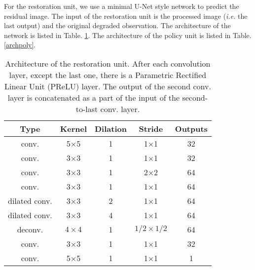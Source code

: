 \documentclass{article} %
\begin{document}
For the restoration unit, we use a minimal
U-Net \citep{ronneberger2015u} style network to predict the residual image.
The input of the restoration unit is the processed image (\textit{i.e.} the
last output) and the original degraded observation. The architecture of
the network is listed in Table. \ref{arch}.
The architecture of the policy unit is listed in Table. \ref{archpoly}.

\begin{table}[htp!]
	\caption{Architecture of the restoration unit. After each convolution layer,
		except the last one, there is a Parametric Rectified Linear Unit (PReLU) layer.
		The output of the second conv. layer is concatenated as a part of the input of
		the second-to-last conv. layer.}
	\label{arch}
	\centering
	\begin{tabular}{ccccc}
		\toprule
		Type & Kernel & Dilation & Stride & Outputs\\
		\hline\hline
		conv.& 5$\times$5& 1 & 1$\times$1 &32\\
		conv.& 3$\times$3& 1 & 1$\times$1 &32\\
		\hline
		conv.& 3$\times$3& 1 & 2$\times$2 &64\\
		
		conv.& 3$\times$3&1&1$\times$1&64\\
		dilated conv.&3$\times$3&2&1$\times$1&64\\
		dilated conv.&3$\times$3&4&1$\times$1&64\\
		\hline
		deconv.&$4\times 4$&1&$1/2 \times1/2$&64\\
		conv.& 3$\times$3&1&1$\times$1&32\\
		conv.& 5$\times$5&1&1$\times$1&1\\
		\hline		
	\end{tabular}
\end{table}
\end{document}
